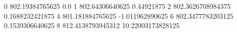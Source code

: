 0 802.19384765625 0.0
1 802.64306640625 0.44921875
2 802.3626708984375 0.1688232421875
4 801.181884765625 -1.011962890625
6 802.3477783203125 0.1539306640625
8 812.4138793945312 10.22003173828125
